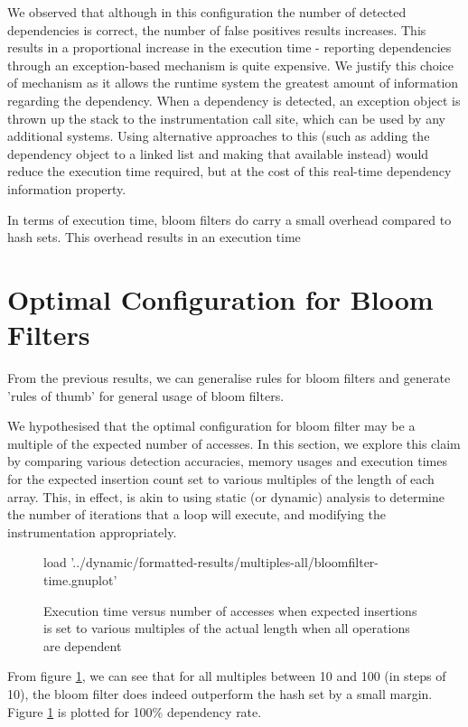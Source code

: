 	We observed that although in this configuration the number of detected dependencies is correct, the number of false positives results increases. This results in a proportional increase in the execution time - reporting dependencies through an exception-based mechanism is quite expensive. We justify this choice of mechanism as it allows the runtime system the greatest amount of information regarding the dependency. When a dependency is detected, an exception object is thrown up the stack to the instrumentation call site, which can be used by any additional systems. Using alternative approaches to this (such as adding the dependency object to a linked list and making that available instead) would reduce the execution time required, but at the cost of this real-time dependency information property.
	
	In terms of execution time, bloom filters do carry a small overhead compared to hash sets. This overhead results in an execution time 
	 
\section{Optimal Configuration for Bloom Filters} \label{sec:results/opt-conf}
From the previous results, we can generalise rules for bloom filters and generate 'rules of thumb' for general usage of bloom filters.

We hypothesised that the optimal configuration for bloom filter may be a multiple of the expected number of accesses. In this section, we explore this claim by comparing various detection accuracies, memory usages and execution times for the expected insertion count set to various multiples of the length of each array. This, in effect, is akin to using static (or dynamic) analysis to determine the number of iterations that a loop will execute, and modifying the instrumentation appropriately.

\begin{figure}
	\centering
	\begin{gnuplot}[terminal=pdf]
	load '../dynamic/formatted-results/multiples-all/bloomfilter-time.gnuplot'
	\end{gnuplot}
	\caption{Execution time versus number of accesses when expected insertions is set to various multiples of the actual length when all operations are dependent}
	\label{chart:multiples-all}
\end{figure}

From figure \ref{chart:multiples-all}, we can see that for all multiples between 10 and 100 (in steps of 10), the bloom filter does indeed outperform the hash set by a small margin. Figure \ref{chart:multiples-all} is plotted for 100\% dependency rate.

